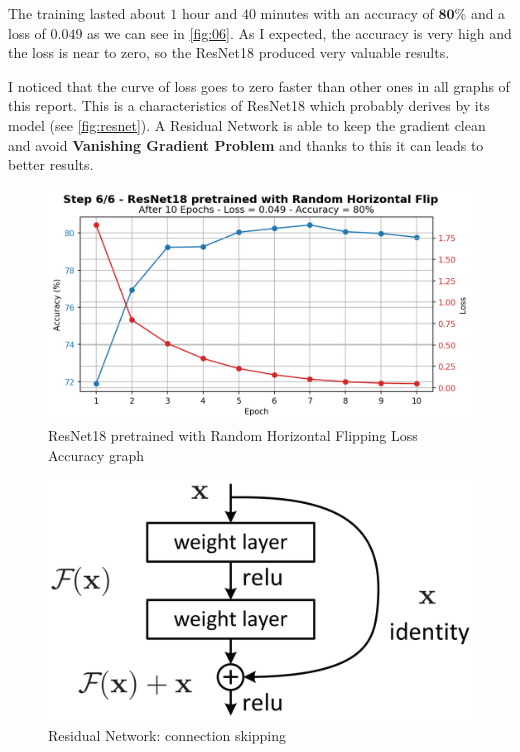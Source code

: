 \documentclass[a4paper, 11pt]{article}
\begin{document}
	The training lasted about $1$ hour and $40$ minutes with an accuracy of $\boldsymbol{80\%}$ and a loss of $\boldsymbol{0.049}$ as we can see in \vref{fig:06}.
	As I expected, the accuracy is very high and the loss is near to zero, so the ResNet18 produced very valuable results.
	
	I noticed that the curve of loss goes to zero faster than other ones in all graphs of this report.
	This is a characteristics of ResNet18 which probably derives by its model (see \vref{fig:resnet}). A Residual Network is able to keep the gradient clean and avoid \textbf{Vanishing Gradient Problem} and thanks to this it can leads to better results.
	
	
	\begin{figure}[ht!]
		\centering
		\includegraphics[width=0.62\paperwidth]{img/fig06.png}
		\caption{ResNet18 pretrained with Random Horizontal Flipping Loss Accuracy graph}
		\label{fig:06}
	\end{figure}

\begin{figure}[ht!]
	\centering
	\includegraphics[width=0.3\paperwidth]{img/res.png}
	\caption{Residual Network: connection skipping}
	\label{fig:resnet}
\end{figure}
\end{document}
